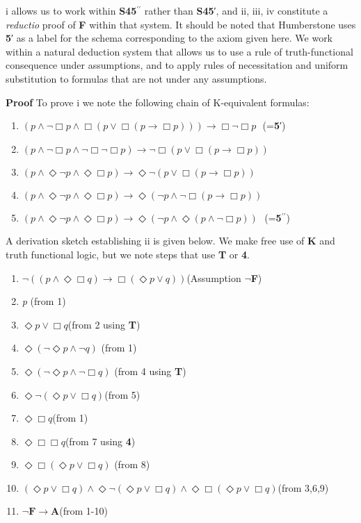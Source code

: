 \documentclass[
  10pt,
  letterpaper,
  DIV=11,
  numbers=noendperiod,
  twoside]{scrartcl}
\providecommand{\tightlist}{%
  \setlength{\itemsep}{0pt}\setlength{\parskip}{0pt}}\usepackage{longtable,booktabs,array}
\begin{document}
i allows us to work within \textbf{S45}\(^{\prime\prime}\) rather than
\textbf{S45}′, and ii, iii, iv constitute a \emph{reductio} proof of
\textbf{F} within that system. It should be noted that Humberstone uses
\textbf{5}′ as a label for the schema corresponding to the axiom given
here. We work within a natural deduction system that allows us to use a
rule of truth-functional consequence under assumptions, and to apply
rules of necessitation and uniform substitution to formulas that are not
under any assumptions.

\textbf{Proof} To prove i we note the following chain of K-equivalent
formulas:

\begin{enumerate}
\def\labelenumi{\arabic{enumi}.}
\tightlist
\item
  \((p \wedge \neg \Box p \wedge \Box (p \vee \Box (p \rightarrow \Box p))) \rightarrow \Box \neg \Box p~~~\)(=\textbf{5}′)
\item
  \((p \wedge \neg \Box p \wedge \neg \Box \neg \Box p) \rightarrow \neg \Box (p \vee \Box (p \rightarrow \Box p))\)
\item
  \((p \wedge \Diamond\neg p \wedge \Diamond\Box p) \rightarrow \Diamond\neg (p \vee \Box (p \rightarrow \Box p))\)
\item
  \((p \wedge \Diamond\neg p \wedge \Diamond\Box p) \rightarrow \Diamond(\neg p \wedge \neg \Box (p \rightarrow \Box p))\)
\item
  \((p \wedge \Diamond\neg p \wedge \Diamond\Box p) \rightarrow \Diamond(\neg p \wedge \Diamond(p \wedge \neg \Box p))~~~\)(=\textbf{5}\(^{\prime\prime}\))
\end{enumerate}

A derivation sketch establishing ii is given below. We make free use of
\textbf{K} and truth functional logic, but we note steps that use
\textbf{T} or \textbf{4}.

\begin{enumerate}
\def\labelenumi{\arabic{enumi}.}
\tightlist
\item
  \(\neg ((p\wedge \Diamond\Box q) \rightarrow \Box (\Diamond{p}\vee q))\)(Assumption
  \(\neg\)\textbf{F})
\item
  \emph{p} (from 1)
\item
  \(\Diamond{p}\vee \Box q\)(from 2 using \textbf{T})
\item
  \(\Diamond(\neg \Diamond{p}\wedge \neg q)\) (from 1)
\item
  \(\Diamond(\neg \Diamond{p}\wedge \neg \Box q)\) (from 4 using
  \textbf{T})
\item
  \(\Diamond\neg (\Diamond{p}\vee \Box q)\)(from 5)
\item
  \(\Diamond\Box q\)(from 1)
\item
  \(\Diamond\Box \Box q\)(from 7 using \textbf{4})
\item
  \(\Diamond\Box (\Diamond{p}\vee \Box q)\) (from 8)
\item
  \((\Diamond{p}\vee \Box q) \wedge \Diamond\neg (\Diamond{p}\vee \Box q)\wedge \Diamond\Box (\Diamond{p}\vee \Box q)\)(from
  3,6,9)
\item
  \(\neg \textbf{F} \rightarrow \textbf{A}\)(from 1-10)
\end{enumerate}
\end{document}
